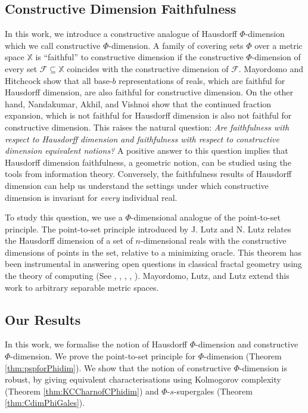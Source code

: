 \documentclass[11pt]{article}
\newcommand{\F}{{\mathcal{F}}}
\newcommand{\X}{{\mathbb{X}}}
\renewcommand{\F}{\mathcal{F}}
\begin{document}
\subsection{Constructive Dimension Faithfulness}

In this work, we introduce a constructive analogue of Hausdorff
$\Phi$-dimension which we call constructive $\Phi$-dimension. A family of covering sets $\Phi$ over a metric space $\X$ is ``faithful'' to constructive dimension if the  constructive $\Phi$-dimension of every set $\F \subseteq \X$ coincides with the constructive dimension of $\F$. 
Mayordomo and Hitchcock \cite{HitchMayor13} show that all
base-$b$ representations of reals, which are faithful for Hausdorff dimension, are also faithful for constructive dimension. On
the other hand, Nandakumar, Akhil, and Vishnoi \cite{Nandakumar2023b} show that the
continued fraction expansion, which is not faithful for Hausdorff
dimension is also not faithful for constructive dimension.
This raises the natural question: \emph{Are faithfulness with respect to
	Hausdorff dimension and faithfulness with respect to constructive
	dimension equivalent notions?} A positive answer to this question
implies that Hausdorff dimension faithfulness, a geometric notion, can be
studied using the tools from information theory. Conversely, the
faithfulness results of Hausdorff dimension can help us understand the
settings under which constructive dimension is invariant for
\emph{every} individual real.

To study this question, we use a $\Phi$-dimensional analogue
of the point-to-set principle.
The point-to-set principle introduced by J. Lutz and
N. Lutz \cite{Lutz2018} relates the Hausdorff dimension of a set of $n$-dimensional reals with
the constructive dimensions of points in the set, relative to a minimizing
oracle. This theorem has been instrumental in answering open questions
in classical fractal geometry using the theory of computing (See
\cite{Lutz2020}, \cite{LutzStull18}, \cite{LutzStull20},
\cite{NeilLutz21}, \cite{Lutz2018}). Mayordomo, Lutz, and Lutz
\cite{Lutz2022} extend this work to arbitrary separable metric spaces.

\subsection{Our Results}


In this work, we formalise the notion of Hausdorff $\Phi$-dimension and constructive $\Phi$-dimension.   We prove the point-to-set principle for
$\Phi$-dimension (Theorem \ref{thm:pspforPhidim}).
We show that the notion of constructive $\Phi$-dimension is robust, by giving equivalent characterisations using Kolmogorov complexity  (Theorem \ref{thm:KCCharnofCPhidim}) and $\Phi$-$s$-supergales (Theorem \ref{thm:CdimPhiGales}).
\end{document}

